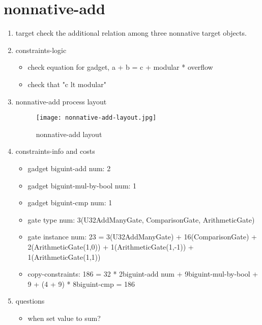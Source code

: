 \section{nonnative-add}
\label{nonnative-add}

\begin{enumerate}
    \item target
        check the additional relation among three nonnative target objects.
    \item constraints-logic
        \begin{itemize}
            \item check equation for gadget,  a + b = c + modular * overflow
            \item check that "c lt modular"
        \end{itemize}
    \item nonnative-add process layout
        \begin{figure}[!ht]
            \centering
            \texttt{[image: nonnative-add-layout.jpg]}
            \caption{nonnative-add layout}
            \label{fig:nonnative-add-layout}
        \end{figure}
    
    \item constraints-info and costs
        \begin{itemize}
            \item gadget biguint-add num: 2
            \item gadget biguint-mul-by-bool num: 1
            \item gadget biguint-cmp num: 1
            \item gate type num: 3(U32AddManyGate, ComparisonGate, ArithmeticGate)
            \item gate instance num: 23 = 3(U32AddManyGate) + 16(ComparisonGate) + 2(ArithmeticGate(1,0)) + 1(ArithmeticGate(1,-1)) + 1(ArithmeticGate(1,1))
            \item copy-constraints: 186 = 32 * 2{biguint-add num} + 9{biguint-mul-by-bool} + 9 + (4 + 9) * 8{biguint-cmp} = 186
        \end{itemize}

    \item questions
        \begin{itemize}
            \item when set value to sum?
        \end{itemize}

\end{enumerate}